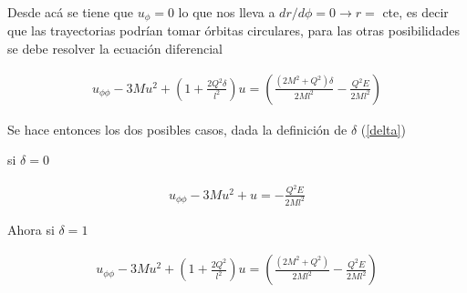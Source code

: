 \documentclass[DIN, pagenumber=false, fontsize=11pt, parskip=half]{scrartcl}
\begin{document}
Desde acá se tiene que $u_{\phi} = 0$ lo que nos lleva a $dr/d\phi = 0 \longrightarrow r =$ cte, es decir que las trayectorias podrían tomar órbitas circulares, para las otras posibilidades se debe resolver la ecuación diferencial

\begin{eqnarray}
    u_{\phi\phi} -3Mu^{2} + \left(1+\frac{2Q^{2}\delta}{l^{2}}\right)u =  \left(\frac{(2M^{2}+Q^{2})\delta}{2Ml^{2}}-\frac{Q^{2}E}{2Ml^{2}}\right)  
\end{eqnarray}

Se hace entonces los dos posibles casos, dada la definición de $\delta$ (\ref{delta})

si $\delta = 0$

\begin{eqnarray}
    u_{\phi\phi} -3Mu^{2} + u =  -\frac{Q^{2}E}{2Ml^{2}} 
\end{eqnarray}

Ahora si $\delta = 1$

\begin{eqnarray}
    u_{\phi\phi} -3Mu^{2} + \left(1+\frac{2Q^{2}}{l^{2}}\right)u =  \left(\frac{(2M^{2}+Q^{2})}{2Ml^{2}}-\frac{Q^{2}E}{2Ml^{2}}\right)  
\end{eqnarray}
\end{document}
